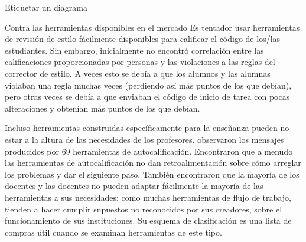 \begin{aside}{Etiquetar un diagrama}
\begin{aside}{Contra las herramientas disponibles en el mercado}
Es tentador usar herramientas de revisión de estilo fácilmente disponibles para calificar el código de los/las estudiantes.
Sin embargo,
\cite{Nutb2016} inicialmente no encontró correlación entre las calificaciones proporcionadas por personas 
y las violaciones a las reglas del corrector de estilo.
A veces esto se debía a que los alumnos y las alumnas violaban una regla muchas veces 
(perdiendo así más puntos de los que debían), 
pero otras veces se debía a que enviaban el código de inicio de tarea con pocas alteraciones y obtenían más puntos de los que debían.

 Incluso herramientas construidas específicamente para la enseñanza pueden no estar a la altura de las necesidades de los profesores.
   \cite{Keun2016a,Keun2016b}  observaron los mensajes producidos por 69 herramientas de autocalificación.
  Encontraron que a menudo las herramientas de autocalificación no dan retroalimentación sobre cómo arreglar los problemas y dar el siguiente paso.
    También encontraron que la mayoría de los docentes y las docentes no pueden adaptar fácilmente la mayoría de las herramientas a sus necesidades: 
como muchas herramientas de flujo de trabajo, tienden a hacer cumplir supuestos no reconocidos por sus creadores, sobre el funcionamiento de sus instituciones.
  Su esquema de clasificación es una lista de compras útil cuando se examinan herramientas de este tipo.
\end{aside}


\end{aside}
